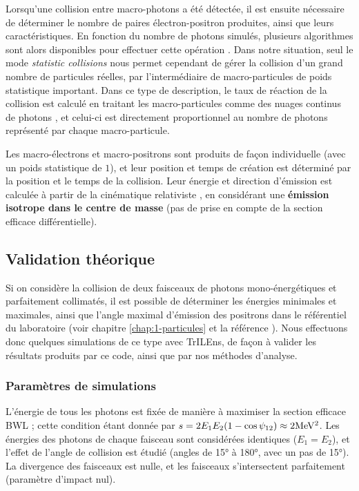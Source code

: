 \begin{refsection}
Lorsqu'une collision entre macro-photons a été détectée, il est ensuite nécessaire de déterminer le nombre de paires électron-positron produites, ainsi que leurs caractéristiques. En fonction du nombre de photons simulés, plusieurs algorithmes sont alors disponibles pour effectuer cette opération \parencite{jansen_2018}. Dans notre situation, seul le mode \textit{statistic collisions} nous permet cependant de gérer la collision d'un grand nombre de particules réelles, par l'intermédiaire de macro-particules de poids statistique important. Dans ce type de description, le taux de réaction de la collision est calculé en traitant les macro-particules comme des nuages continus de photons \parencite{jansen_2018}, et celui-ci est directement proportionnel au nombre de photons représenté par chaque macro-particule. 

Les macro-électrons et macro-positrons sont produits de façon individuelle (avec un poids statistique de $1$), et leur position et temps de création est déterminé par la position et le temps de la collision. Leur énergie et direction d'émission est calculée à partir de la cinématique relativiste \parencite{ribeyre_2017}, en considérant une \textbf{émission isotrope dans le centre de masse} (pas de prise en compte de la section efficace différentielle).


\subsection{Validation théorique}

Si on considère la collision de deux faisceaux de photons mono-énergétiques et parfaitement collimatés, il est possible de déterminer les énergies minimales et maximales, ainsi que l'angle maximal d'émission des positrons dans le référentiel du laboratoire (voir chapitre \ref{chap:1-particules} et la référence \parencite{ribeyre_2017}). Nous effectuons donc quelques simulations de ce type avec TrILEns, de façon à valider les résultats produits par ce code, ainsi que par nos méthodes d'analyse.

\subsubsection{Paramètres de simulations}

L'énergie de tous les photons est fixée de manière à maximiser la section efficace BWL ; cette condition étant donnée par $s=2 E_1 E_2 (1-\cos\psi_{12}) \approx 2 \rm MeV^2$. Les énergies des photons de chaque faisceau sont considérées identiques ($E_1=E_2$), et l'effet de l'angle de collision est étudié (angles de 15° à 180°, avec un pas de 15°). La divergence des faisceaux est nulle, et les faisceaux s'intersectent parfaitement (paramètre d'impact nul).


\end{refsection}
